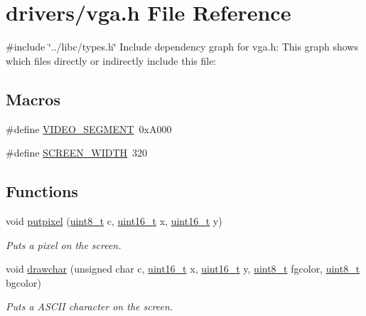 \hypertarget{a00005}{}\section{drivers/vga.h File Reference}
\label{a00005}
{\ttfamily \#include \char`\"{}../libc/types.\+h\char`\"{}}\newline
Include dependency graph for vga.\+h\+:
This graph shows which files directly or indirectly include this file\+:
\subsection*{Macros}
\begin{DoxyCompactItemize}
\item 
\#define \hyperlink{a00005_a818608c80027ef8ff56d31ebaedf58f3_a818608c80027ef8ff56d31ebaedf58f3}{V\+I\+D\+E\+O\+\_\+\+S\+E\+G\+M\+E\+NT}~0x\+A000
\item 
\#define \hyperlink{a00005_a2cd109632a6dcccaa80b43561b1ab700_a2cd109632a6dcccaa80b43561b1ab700}{S\+C\+R\+E\+E\+N\+\_\+\+W\+I\+D\+TH}~320
\end{DoxyCompactItemize}
\subsection*{Functions}
\begin{DoxyCompactItemize}
\item 
void \hyperlink{a00005_ab17a69b465efb1ebe54a6a2e5d7b7ce8_ab17a69b465efb1ebe54a6a2e5d7b7ce8}{putpixel} (\hyperlink{a00023_aba7bc1797add20fe3efdf37ced1182c5_aba7bc1797add20fe3efdf37ced1182c5}{uint8\+\_\+t} c, \hyperlink{a00023_a273cf69d639a59973b6019625df33e30_a273cf69d639a59973b6019625df33e30}{uint16\+\_\+t} x, \hyperlink{a00023_a273cf69d639a59973b6019625df33e30_a273cf69d639a59973b6019625df33e30}{uint16\+\_\+t} y)
\begin{DoxyCompactList}\small\item\em Puts a pixel on the screen. \end{DoxyCompactList}\item 
void \hyperlink{a00005_a2c8df7a20b47341b70d97a7ff21d86ea_a2c8df7a20b47341b70d97a7ff21d86ea}{drawchar} (unsigned char c, \hyperlink{a00023_a273cf69d639a59973b6019625df33e30_a273cf69d639a59973b6019625df33e30}{uint16\+\_\+t} x, \hyperlink{a00023_a273cf69d639a59973b6019625df33e30_a273cf69d639a59973b6019625df33e30}{uint16\+\_\+t} y, \hyperlink{a00023_aba7bc1797add20fe3efdf37ced1182c5_aba7bc1797add20fe3efdf37ced1182c5}{uint8\+\_\+t} fgcolor, \hyperlink{a00023_aba7bc1797add20fe3efdf37ced1182c5_aba7bc1797add20fe3efdf37ced1182c5}{uint8\+\_\+t} bgcolor)
\begin{DoxyCompactList}\small\item\em Puts a A\+S\+C\+II character on the screen. \end{DoxyCompactList}\end{DoxyCompactItemize}


